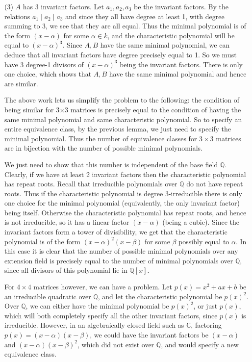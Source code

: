 \documentclass[12pt]{article}
\theoremstyle{definitionstyle}
\def\mbb#1{\mathbb{#1}}
\def \C{\mbb{C}}
\newcommand{\Q}{\mbb Q}
\begin{document}
\begin{enumerate}
		(3) $A$ has 3 invariant factors. Let $a_1, a_2, a_3$ be the invariant factors. By the relations $a_1 \mid a_2 \mid a_3$ and since they all have degree at least 1, with degree summing to 3, we see that they are all equal. Thus the minimal polynomial is of the form $(x-\alpha)$ for some $\alpha \in k$, and the characteristic polynomial will be equal to $(x-\alpha)^3$. Since $A,B$ have the same minimal polynomial, we can deduce that all invariant factors have degree precisely equal to 1. So we must have 3 degree-1 divisors of $(x-\alpha)^3$ being the invariant factors. There is only one choice, which shows that $A,B$ have the same minimal polynomial and hence are similar. 
		
		The above work lets us simplify the problem to the following: the condition of being similar for 3$\times$3 matrices is precisely equal to the condition of having the same minimal polynomial and same characteristic polynomial. So to specify an entire equivalence class, by the previous lemma, we just need to specify the minimal polynomial. Thus the number of equivalence classes for $3 \times 3$ matrices are in bijection with the number of possible minimal polynomials.
		
		 We just need to show that this number is independent of the base field $\Q$. Clearly, if we have at least 2 invariant factors then the characteristic polynomial has repeat roots. Recall that irreducible polynomials over $\Q$ do not have repeat roots. Thus if the characteristic polynomial is degree 3-irreducible there is only one choice for the minimal polynomial (equivalently, the only invariant factor) being itself. Otherwise the characteristic polynomial has repeat roots, and hence is not irreducible, so it has a linear factor $(x-\alpha)$ (being a cubic). Since the invariant factors form a tower of divisibility, we get that the characteristic polynomial is of the form $(x-\alpha)^2(x-\beta)$ for some $\beta$ possibly equal to $\alpha$. In this case it is clear that the number of possible minimal polynomials over any extension field is precisely equal to the number of minimal polynomials over $\Q$, since all divisors of this polynomial lie in $\Q[x]$. 
		
		For $4 \times 4$ matrices however, we can have a problem. Let $p(x) = x^2 + ax + b$ be an irreducible quadratic over $\Q$, and let the characteristic polynomial be $p(x)^2$. Over $\Q$, we can either have the minimal polynomial be $p(x)^2$, or just $p(x)$, which will both completely specify all the other invariant factors, since $p(x)$ is irreducible. However, in an algebraically closed field such as $\C$, factoring $p(x) = (x-\alpha)(x-\beta)$, we could have the invariant factors be $(x-\alpha)$ and $(x-\alpha)(x-\beta)^2$, which did not exist over $\Q$, and would specify a new equivalence class.
		

\end{enumerate}
\end{document}
